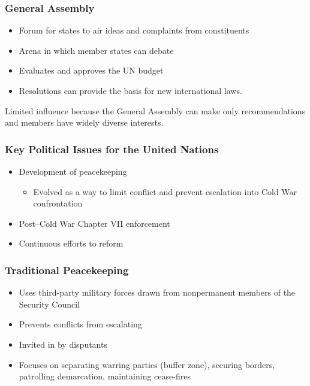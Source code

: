 \documentclass[
]{book}
\providecommand{\tightlist}{%
  \setlength{\itemsep}{0pt}\setlength{\parskip}{0pt}}
\begin{document}
\hypertarget{general-assembly}{%
\subsubsection{General Assembly}\label{general-assembly}}

\begin{itemize}
\item
  Forum for states to air ideas and complaints from constituents
\item
  Arena in which member states can debate
\item
  Evaluates and approves the UN budget
\item
  Resolutions can provide the basis for new international laws.
\end{itemize}

Limited influence because the General Assembly can make only recommendations and members have widely diverse interests.

\hypertarget{key-political-issues-for-the-united-nations}{%
\subsubsection{Key Political Issues for the United Nations}\label{key-political-issues-for-the-united-nations}}

\begin{itemize}
\item
  Development of peacekeeping

  \begin{itemize}
  \tightlist
  \item
    Evolved as a way to limit conflict and prevent escalation into Cold War confrontation
  \end{itemize}
\item
  Post--Cold War Chapter VII enforcement
\item
  Continuous efforts to reform
\end{itemize}

\hypertarget{traditional-peacekeeping}{%
\subsubsection{Traditional Peacekeeping}\label{traditional-peacekeeping}}

\begin{itemize}
\item
  Uses third-party military forces drawn from nonpermanent members of the Security Council
\item
  Prevents conflicts from escalating
\item
  Invited in by disputants
\item
  Focuses on separating warring parties (buffer zone), securing borders, patrolling demarcation, maintaining cease-fires
\end{itemize}
\end{document}
